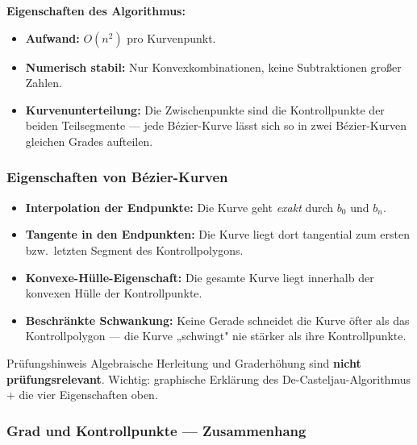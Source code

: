 \documentclass[12pt, a4paper]{article}
\begin{document}
\textbf{Eigenschaften des Algorithmus:}
\begin{itemize}
  \item \textbf{Aufwand:} $O(n^2)$ pro Kurvenpunkt.
  \item \textbf{Numerisch stabil:} Nur Konvexkombinationen, keine Subtraktionen großer Zahlen.
  \item \textbf{Kurvenunterteilung:} Die Zwischenpunkte sind die Kontrollpunkte der beiden Teilsegmente — jede Bézier-Kurve lässt sich so in zwei Bézier-Kurven gleichen Grades aufteilen.
\end{itemize}

\subsubsection*{Eigenschaften von Bézier-Kurven}

\begin{itemize}
  \item \textbf{Interpolation der Endpunkte:} Die Kurve geht \textit{exakt} durch $b_0$ und $b_n$.
  \item \textbf{Tangente in den Endpunkten:} Die Kurve liegt dort tangential zum ersten bzw.\ letzten Segment des Kontrollpolygons.
  \item \textbf{Konvexe-Hülle-Eigenschaft:} Die gesamte Kurve liegt innerhalb der konvexen Hülle der Kontrollpunkte.
  \item \textbf{Beschränkte Schwankung:} Keine Gerade schneidet die Kurve öfter als das Kontrollpolygon — die Kurve „schwingt" nie stärker als ihre Kontrollpunkte.
\end{itemize}

\begin{notebox}{Prüfungshinweis}
Algebraische Herleitung und Graderhöhung sind \textbf{nicht prüfungsrelevant}. Wichtig: graphische Erklärung des De-Casteljau-Algorithmus + die vier Eigenschaften oben.
\end{notebox}

\subsubsection*{Grad und Kontrollpunkte — Zusammenhang}
\end{document}
